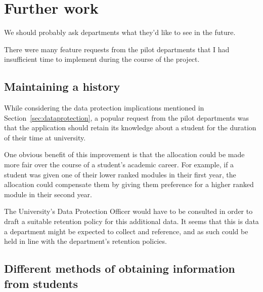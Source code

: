 \documentclass[]{scrartcl}
\begin{document}
% 

\section{Further work}
\label{sec:furtherwork}


We should probably ask departments what they'd like to see in the future.

There were many feature requests from the pilot departments that I had
insufficient time to implement during the course of the project.

\subsection{Maintaining a history}

While considering the data protection implications mentioned in
Section~\ref{sec:dataprotection}, a popular request from the pilot departments
was that the application should retain its knowledge about a student for the
duration of their time at university.

One obvious benefit of this improvement is that the allocation could be made
more fair over the course of a student's academic career. For example, if a
student was given one of their lower ranked modules in their first year, the
allocation could compensate them by giving them preference for a higher ranked
module in their second year.

The University's Data Protection Officer would have to be consulted in order
to draft a suitable retention policy for this additional data. It seems that
this is data a department might be expected to collect and reference, and as
such could be held in line with the department's retention policies.

\subsection{Different methods of obtaining information from students}
\end{document}

